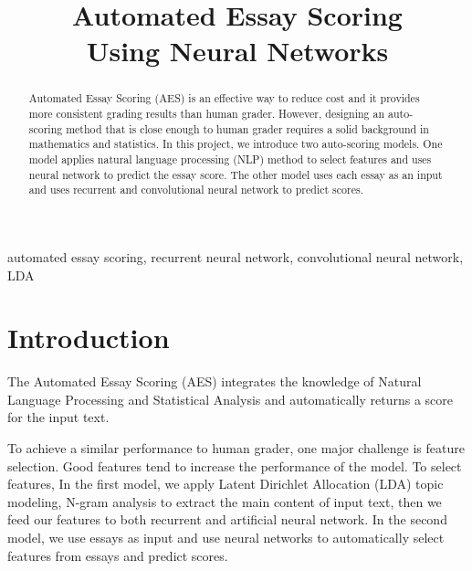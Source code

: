 \documentclass[11pt,conference]{IEEEtran}
\begin{document}
\title{Automated Essay Scoring \\Using Neural Networks}

\author{
\and
{}
\and
{}
}

\maketitle

\begin{abstract}
Automated Essay Scoring (AES) is an effective way to reduce cost and it provides more consistent grading results than human grader. However, designing an auto-scoring method that is close enough to human grader requires a solid background in mathematics and statistics. 
In this project, we introduce two auto-scoring models. One model applies natural language processing (NLP) method to select features and uses neural network to predict the essay score. The other model uses each essay as an input and uses recurrent and convolutional neural network to predict scores. 
\end{abstract}

\begin{IEEEkeywords}
automated essay scoring, recurrent neural network, convolutional neural network, LDA
\end{IEEEkeywords}

\section{Introduction}
The Automated Essay Scoring (AES) integrates the knowledge of Natural Language Processing and Statistical Analysis and automatically returns a score for the input text.

To achieve a similar performance to human grader, one major challenge is feature selection. Good features tend to increase the performance of the model. To select features, In the first model, we apply Latent Dirichlet Allocation (LDA) topic modeling, N-gram analysis to extract the main content of input text, then we feed our features to both recurrent and artificial neural network. In the second model, we use essays as input and use neural networks to automatically select features from essays and predict scores.  
\end{document}
